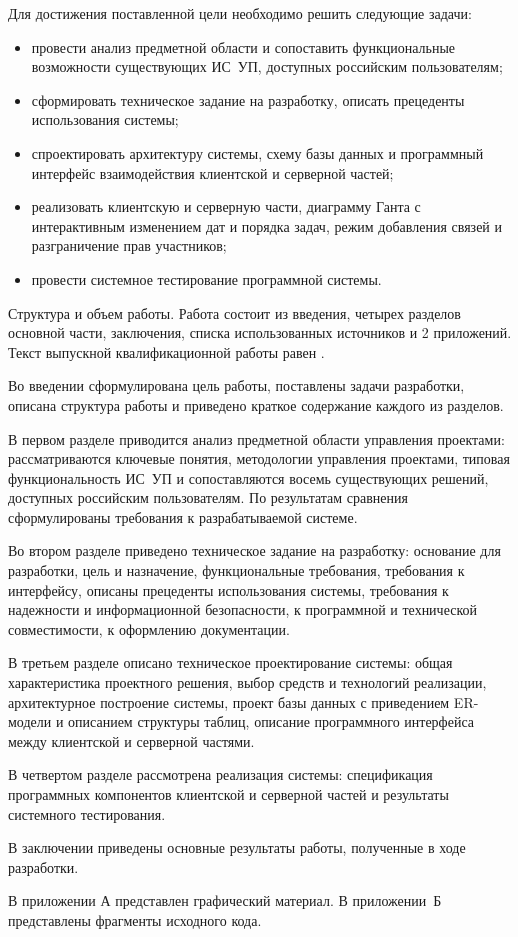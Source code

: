 Для достижения поставленной цели необходимо решить следующие задачи:
\begin{itemize}
\item провести анализ предметной области и сопоставить функциональные возможности существующих ИС~УП, доступных российским пользователям;
\item сформировать техническое задание на разработку, описать прецеденты использования системы;
\item спроектировать архитектуру системы, схему базы данных и программный интерфейс взаимодействия клиентской и серверной частей;
\item реализовать клиентскую и серверную части, диаграмму Ганта с интерактивным изменением дат и порядка задач, режим добавления связей и разграничение прав участников;
\item провести системное тестирование программной системы.
\end{itemize}

Структура и объем работы. Работа состоит из введения, четырех разделов основной части, заключения, списка использованных источников и 2 приложений. Текст выпускной квалификационной работы равен .

Во введении сформулирована цель работы, поставлены задачи разработки, описана структура работы и приведено краткое содержание каждого из разделов.

В первом разделе приводится анализ предметной области управления проектами: рассматриваются ключевые понятия, методологии управления проектами, типовая функциональность ИС~УП и сопоставляются восемь существующих решений, доступных российским пользователям. По результатам сравнения сформулированы требования к разрабатываемой системе.

Во втором разделе приведено техническое задание на разработку: основание для разработки, цель и назначение, функциональные требования, требования к интерфейсу, описаны прецеденты использования системы, требования к надежности и информационной безопасности, к программной и технической совместимости, к оформлению документации.

В третьем разделе описано техническое проектирование системы: общая характеристика проектного решения, выбор средств и технологий реализации, архитектурное построение системы, проект базы данных с приведением ER-модели и описанием структуры таблиц, описание программного интерфейса между клиентской и серверной частями.

В четвертом разделе рассмотрена реализация системы: спецификация программных компонентов клиентской и серверной частей и результаты системного тестирования.

В заключении приведены основные результаты работы, полученные в ходе разработки.

В приложении А представлен графический материал. В приложении~Б представлены фрагменты исходного кода.

